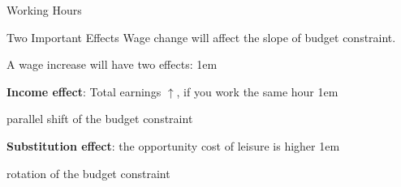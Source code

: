 \documentclass[11pt,aspectratio=43,usenames,dvipsnames]{beamer}
\let\olditemize=\itemize
\let\endolditemize=\enditemize
\renewenvironment{itemize}{\olditemize \itemsep1em}{\endolditemize}
\let\oldenumerate=\enumerate
\let\endoldenumerate=\endenumerate
\renewenvironment{enumerate}{\oldenumerate \itemsep1em}{ \endoldenumerate}
\theoremstyle{definition}
\begin{document}
\begin{frame}[fragile]{Working Hours}


\end{frame}

\begin{frame}{Two Important Effects}
\label{slide:Two_Important_Effects}
    Wage change will affect the slope of budget constraint.

    A wage increase will have two effects:
    \begin{enumerate}
        \item \textbf{Income effect}: Total earnings $ \uparrow  $, if you work the same hour
        \begin{itemize}
            \item \alert{parallel shift} of the budget constraint
        \end{itemize}

        \item \textbf{Substitution effect}: the opportunity cost of leisure is higher
        \begin{itemize}
            \item \alert{rotation} of the budget constraint
        \end{itemize}
    \end{enumerate}
\end{frame}
\end{document}
